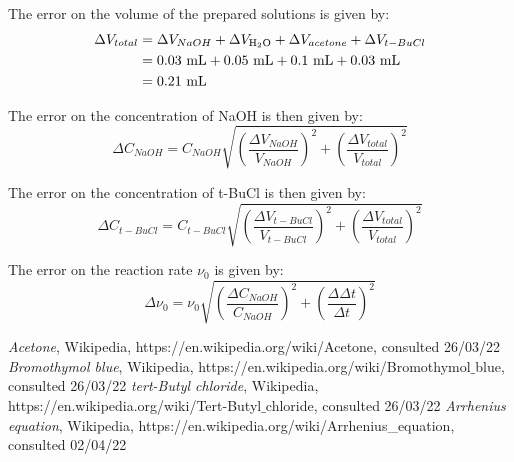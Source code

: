 \documentclass[12pt]{article}
\begin{document}
The error on the volume of the prepared solutions is given by: \begin{align} \Delta V_{total} &= \Delta V_{NaOH} + \Delta V_{\ce{H2O}} + \Delta V_{acetone} + \Delta V_{t-BuCl} \nonumber \\ &= 0.03\ \text{mL} + 0.05\ \text{mL} + 0.1\ \text{mL} + 0.03\ \text{mL} \nonumber \\ &= 0.21\ \text{mL} \nonumber \end{align}

\noindent The error on the concentration of NaOH is then given by: \[ \Delta C_{NaOH} = C_{NaOH} \sqrt{\left(\frac{\Delta V_{NaOH}}{V_{NaOH}} \right)^2+\left(\frac{\Delta V_{total}}{V_{total}} \right)^2} \]

\noindent The error on the concentration of t-BuCl is then given by: \[ \Delta C_{t-BuCl} = C_{t-BuCl} \sqrt{\left(\frac{\Delta V_{t-BuCl}}{V_{t-BuCl}} \right)^2+\left(\frac{\Delta V_{total}}{V_{total}} \right)^2} \]

\noindent The error on the reaction rate $\nu_0$ is given by: \[ \Delta \nu_0 = \nu_0 \sqrt{\left(\frac{\Delta C_{NaOH}}{C_{NaOH}} \right)^2+\left(\frac{\Delta \Delta t}{\Delta t} \right)^2}\]

\begin{thebibliography}{}
     \textit{Acetone}, Wikipedia, https://en.wikipedia.org/wiki/Acetone, consulted 26/03/22
     \textit{Bromothymol blue}, Wikipedia, https://en.wikipedia.org/wiki/Bromothymol$\_$blue, consulted 26/03/22
     \textit{tert-Butyl chloride}, Wikipedia, https://en.wikipedia.org/wiki/Tert-Butyl$\_$chloride, consulted 26/03/22
     \textit{Arrhenius equation}, Wikipedia, https://en.wikipedia.org/wiki/Arrhenius\_equation, consulted 02/04/22
\end{thebibliography}
\end{document}
